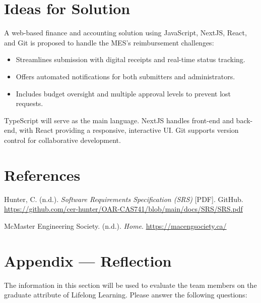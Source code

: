 \documentclass[12pt]{article}
\begin{document}
\section{Ideas for Solution}
A web-based finance and accounting solution using JavaScript, NextJS, React, and Git is proposed to handle the MES’s reimbursement challenges:
\begin{itemize}
    \item Streamlines submission with digital receipts and real-time status tracking.
    \item Offers automated notifications for both submitters and administrators.
    \item Includes budget oversight and multiple approval levels to prevent lost requests.
\end{itemize}
TypeScript will serve as the main language. NextJS handles front-end and back-end, with React providing a responsive, interactive UI. Git supports version control for collaborative development.

\newpage{}
\section*{References}

\begin{flushleft}
Hunter, C. (n.d.). \textit{Software Requirements Specification (SRS)} [PDF]. GitHub.
\url{https://github.com/cer-hunter/OAR-CAS741/blob/main/docs/SRS/SRS.pdf}

\vspace{1em}

McMaster Engineering Society. (n.d.). \textit{Home}.
\url{https://macengsociety.ca/}
\end{flushleft}

\newpage{}
\section*{Appendix --- Reflection}

The information in this section will be used to evaluate the team members on the
graduate attribute of Lifelong Learning. Please answer the following questions:
\end{document}
